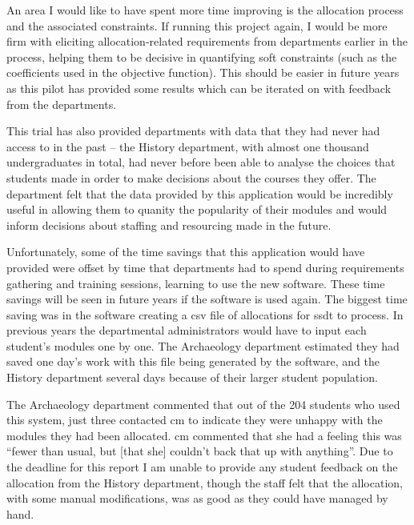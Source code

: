 An area I would like to have spent more time improving is the allocation
process and the associated constraints. If running this project again, I would
be more firm with eliciting allocation-related requirements from departments
earlier in the process, helping them to be decisive in quantifying soft
constraints (such as the coefficients used in the objective function). This
should be easier in future years as this pilot has provided some results which
can be iterated on with feedback from the departments.

This trial has also provided departments with data that they had never had
access to in the past -- the History department, with almost one thousand
undergraduates in total, had never before been able to analyse the choices
that students made in order to make decisions about the courses they offer.
The department felt that the data provided by this application would be
incredibly useful in allowing them to quanity the popularity of their modules
and would inform decisions about staffing and resourcing made in the future.

Unfortunately, some of the time savings that this application would have
provided were offset by time that departments had to spend during requirements
gathering and training sessions, learning to use the new software. These time
savings will be seen in future years if the software is used again. The
biggest time saving was in the software creating a \gls{csv} file of
allocations for \gls{ssdt} to process. In previous years the departmental
administrators would have to input each student's modules one by one. The
Archaeology department estimated they had saved one day's work with this file
being generated by the software, and the History department several days
because of their larger student population.

The Archaeology department commented that out of the 204 students who used
this system, just three contacted \gls{cm} to indicate they were unhappy with
the modules they had been allocated. \gls{cm} commented that she had a feeling
this was ``fewer than usual, but [that she] couldn’t back that up with
anything''. Due to the deadline for this report I am unable to provide any
student feedback on the allocation from the History department, though the
staff felt that the allocation, with some manual modifications, was as good as
they could have managed by hand.
